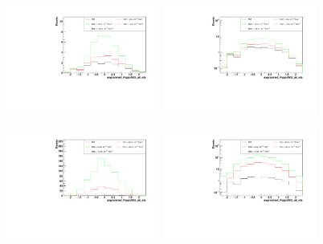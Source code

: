 \begin{figure}[h]
  \begin{center}
	\includegraphics[width=0.45\textwidth]{Plots/aQGC_kinematics/ungroomed_PuppiAK8_jet_eta_FM7.pdf}%
	\includegraphics[width=0.45\textwidth]{Plots/aQGC_kinematics/ungroomed_PuppiAK8_jet_eta_FM7_log.pdf}\\		
    \caption{}
  \end{center}
\end{figure}
\begin{figure}[h]
  \begin{center}
	\includegraphics[width=0.45\textwidth]{Plots/aQGC_kinematics/ungroomed_PuppiAK8_jet_eta_FS0.pdf}%
	\includegraphics[width=0.45\textwidth]{Plots/aQGC_kinematics/ungroomed_PuppiAK8_jet_eta_FS0_log.pdf}\\		
    \caption{}
  \end{center}
\end{figure}
